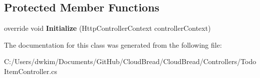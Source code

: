 \subsection*{Protected Member Functions}
\begin{DoxyCompactItemize}
\item 
override void {\bfseries Initialize} (Http\+Controller\+Context controller\+Context)\hypertarget{a00188_a3520799d8af1b44b08f47790cf91d990}{}\label{a00188_a3520799d8af1b44b08f47790cf91d990}

\end{DoxyCompactItemize}


The documentation for this class was generated from the following file\+:\begin{DoxyCompactItemize}
\item 
C\+:/\+Users/dwkim/\+Documents/\+Git\+Hub/\+Cloud\+Bread/\+Cloud\+Bread/\+Controllers/Todo\+Item\+Controller.\+cs\end{DoxyCompactItemize}
